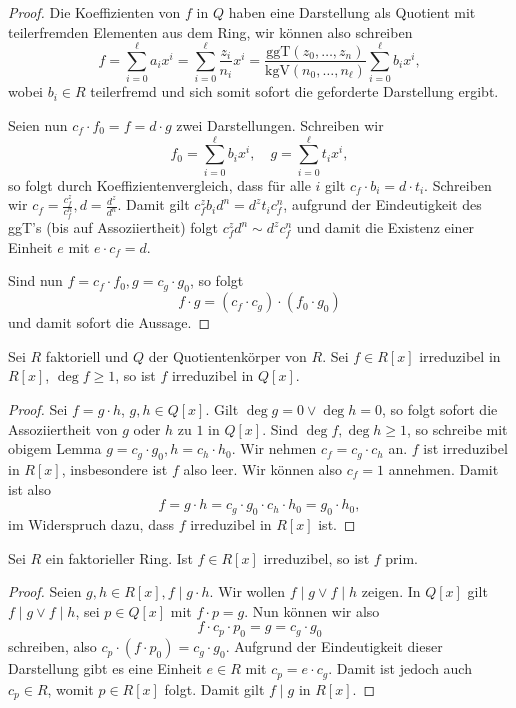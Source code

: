 \begin{proof}
    Die Koeffizienten von $f$ in $Q$ haben eine Darstellung als Quotient mit teilerfremden Elementen aus dem Ring, wir können also schreiben
    $$ f = \sum_{i=0}^\ell a_i x^i = \sum_{i=0}^\ell \frac{z_i}{n_i} x^i = \frac{\mathrm{ggT}(z_0, \hdots, z_n)}{\mathrm{kgV}(n_0, \hdots, n_\ell)} \sum_{i=0}^\ell b_i x^i, $$
    wobei $b_i \in R$ teilerfremd und sich somit sofort die geforderte Darstellung ergibt.

    Seien nun $c_f \cdot f_0 = f = d \cdot g$ zwei Darstellungen. Schreiben wir
    $$ f_0 = \sum_{i=0}^\ell b_i x^i,\quad g = \sum_{i=0}^\ell t_i x^i, $$
    so folgt durch Koeffizientenvergleich, dass für alle $i$ gilt $c_f \cdot b_i = d \cdot t_i$. Schreiben wir $c_f = \frac{c_f^z}{c_f^n}, d = \frac{d^z}{d^n}$. Damit gilt $c_f^z b_i d^n = d^z t_i c_f^n$, aufgrund der Eindeutigkeit des ggT's (bis auf Assoziiertheit) folgt $c_f^z d^n \sim d^z c_f^n$ und damit die Existenz einer Einheit $e$ mit $e \cdot c_f = d$.

    Sind nun $f = c_f \cdot f_0, g = c_g \cdot g_0$, so folgt
    $$ f \cdot g = (c_f \cdot c_g) \cdot (f_0 \cdot g_0) $$
    und damit sofort die Aussage.
\end{proof}

\begin{lemma}
    Sei $R$ faktoriell und $Q$ der Quotientenkörper von $R$. Sei $f \in R[x]$ irreduzibel in $R[x]$, $\deg f \geq 1$, so ist $f$ irreduzibel in $Q[x]$.
\end{lemma}

\begin{proof}
    Sei $f = g \cdot h$, $g, h \in Q[x]$. Gilt $\deg g = 0 \lor \deg h = 0$, so folgt sofort die Assoziiertheit von $g$ oder $h$ zu $1$ in $Q[x]$. Sind $\deg f, \deg h \geq 1$, so schreibe mit obigem Lemma $g = c_g \cdot g_0, h = c_h \cdot h_0$. Wir nehmen \obda $c_f = c_g \cdot c_h$ an. $f$ ist irreduzibel in $R[x]$, insbesondere ist $f$ also leer. Wir können also \obda $c_f = 1$ annehmen. Damit ist also
    $$ f = g \cdot h = c_g \cdot g_0 \cdot c_h \cdot h_0 = g_0 \cdot h_0, $$
    im Widerspruch dazu, dass $f$ irreduzibel in $R[x]$ ist.
\end{proof}

\begin{lemma}
    Sei $R$ ein faktorieller Ring. Ist $f \in R[x]$ irreduzibel, so ist $f$ prim.
\end{lemma}

\begin{proof}
    Seien $g, h \in R[x], f \mid g \cdot h$. Wir wollen $f \mid g \lor f \mid h$ zeigen. In $Q[x]$ gilt $f \mid g \lor f \mid h$, \obda sei $p \in Q[x]$ mit $f \cdot p = g$. Nun können wir also
    $$ f \cdot c_p \cdot p_0 = g = c_g \cdot g_0 $$
    schreiben, also $c_p \cdot (f \cdot p_0) = c_g \cdot g_0$. Aufgrund der Eindeutigkeit dieser Darstellung gibt es eine Einheit $e \in R$ mit $c_p = e \cdot c_g$. Damit ist jedoch auch $c_p \in R$, womit $p \in R[x]$ folgt. Damit gilt $f \mid g$ in $R[x]$.
\end{proof}


